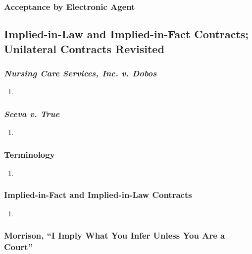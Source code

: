 \subsubsection{Acceptance by Electronic Agent}


\subsection{Implied-in-Law and Implied-in-Fact Contracts; Unilateral Contracts 
Revisited}

\subsubsection{\emph{Nursing Care Services, Inc. v. Dobos}}

\begin{enumerate}
    \item %
\end{enumerate}

\subsubsection{\emph{Sceva v. True}}

\begin{enumerate}
    \item %
\end{enumerate}

\subsubsection{Terminology}

\begin{enumerate}
    \item %
\end{enumerate}

\subsubsection{Implied-in-Fact and Implied-in-Law Contracts}

\begin{enumerate}
    \item %
\end{enumerate}

\subsubsection{Morrison, ``I Imply What You Infer Unless You Are a Court''}

